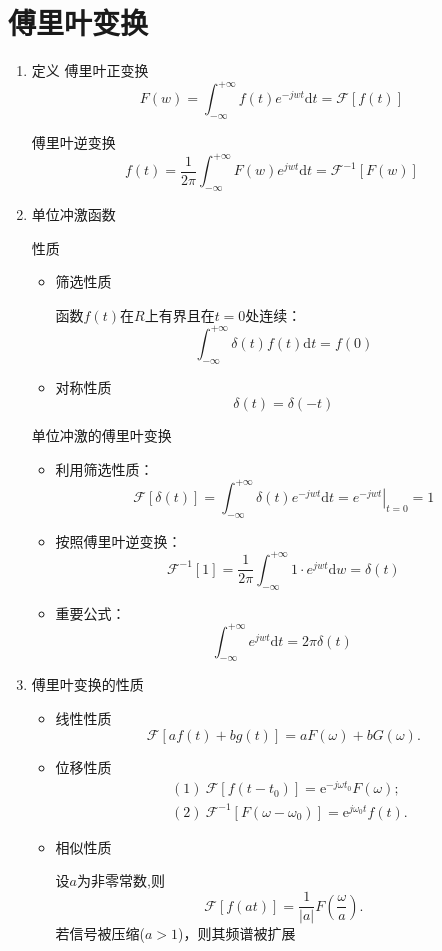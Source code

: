 \documentclass[a4paper,11pt,UTF8]{article}
\begin{document}
\section{傅里叶变换}
\begin{enumerate}
	\item 定义	
	傅里叶正变换
	$$
	F(w)=\int_{-\infty}^{+\infty}f(t)e^{-jwt}\mathrm{d}t=\mathcal{F}[f(t)]
	$$
	
	傅里叶逆变换
	$$
	f(t)=\frac1{2\pi}\int_{-\infty}^{+\infty}F(w)e^{jwt}\mathrm{d}t=\mathcal{F}^{-1}[F(w)]
	$$
	\item 单位冲激函数
	
	性质
	\begin{itemize}
	\item 筛选性质
	
	函数$f(t)$在$R$上有界且在$t=0$处连续：
	$$
	\int_{-\infty}^{+\infty}\delta(t)f(t)\mathrm{d}t=f(0)
	$$
	
	\item 对称性质
	$$\delta(t)=\delta(-t)$$ 
		\end{itemize}
	单位冲激的傅里叶变换
	\begin{itemize}
		\item 利用筛选性质：
		$$
			\mathcal{F}[\delta(t)]=\int_{-\infty}^{+\infty}\delta(t)e^{-jwt}\mathrm{d}t=\left.e^{-jwt}\right|_{t=0}=1
		$$
		\item 按照傅里叶逆变换：
		$$
		\mathcal{F}^{-1}[1]=\frac1{2\pi}\int_{-\infty}^{+\infty}1\cdot e^{jwt}\mathrm{d}w=\delta(t)
		$$
		\item 重要公式：
		$$
		\int_{-\infty}^{+\infty}e^{jwt}\mathrm{d}t=2\pi\delta(t)\
	$$
	\end{itemize}
	\item 傅里叶变换的性质
	\begin{itemize}
		\item 线性性质
		$$
		{\mathcal F}\left[af(t)+bg(t)\right]=aF(\omega)+bG(\omega).
		$$
		
		\item 位移性质
		$$
		\begin{aligned}&(1)\mathrm{~}\mathcal{F}[f(t-t_0)]=\mathrm{e}^{-j\omega t_0}F(\omega);\\&(2)\mathrm{~}\mathcal{F}^{-1}[F(\omega-\omega_0)]=\mathrm{e}^{j\omega_0t}f(t).\end{aligned}
		$$
		
		\item 相似性质
		
		设$a$为非零常数,则
		$$
		\mathcal{F}[f(at)]=\frac1{|a|}F{\left(\frac\omega a\right)}.
		$$
		若信号被压缩($a>1$)，则其频谱被扩展
		

\end{itemize}
\end{enumerate}
\end{document}
